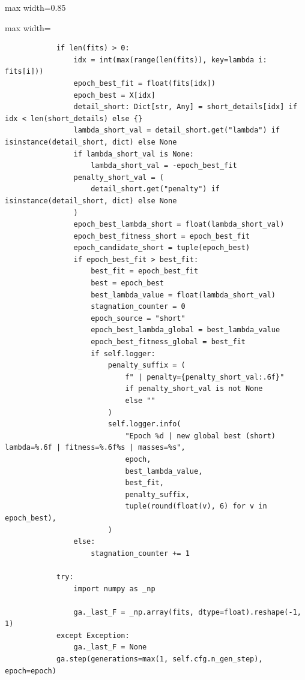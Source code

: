 \begin{listing}[H]
\begin{adjustbox}{max width=0.85\textwidth}
\begin{minipage}{\linewidth}
{\begin{adjustbox}{max width=\textwidth}
\begin{minipage}{\textwidth}
\begin{verbatim}
            if len(fits) > 0:
                idx = int(max(range(len(fits)), key=lambda i: fits[i]))
                epoch_best_fit = float(fits[idx])
                epoch_best = X[idx]
                detail_short: Dict[str, Any] = short_details[idx] if idx < len(short_details) else {}
                lambda_short_val = detail_short.get("lambda") if isinstance(detail_short, dict) else None
                if lambda_short_val is None:
                    lambda_short_val = -epoch_best_fit
                penalty_short_val = (
                    detail_short.get("penalty") if isinstance(detail_short, dict) else None
                )
                epoch_best_lambda_short = float(lambda_short_val)
                epoch_best_fitness_short = epoch_best_fit
                epoch_candidate_short = tuple(epoch_best)
                if epoch_best_fit > best_fit:
                    best_fit = epoch_best_fit
                    best = epoch_best
                    best_lambda_value = float(lambda_short_val)
                    stagnation_counter = 0
                    epoch_source = "short"
                    epoch_best_lambda_global = best_lambda_value
                    epoch_best_fitness_global = best_fit
                    if self.logger:
                        penalty_suffix = (
                            f" | penalty={penalty_short_val:.6f}"
                            if penalty_short_val is not None
                            else ""
                        )
                        self.logger.info(
                            "Epoch %d | new global best (short) lambda=%.6f | fitness=%.6f%s | masses=%s",
                            epoch,
                            best_lambda_value,
                            best_fit,
                            penalty_suffix,
                            tuple(round(float(v), 6) for v in epoch_best),
                        )
                else:
                    stagnation_counter += 1

            try:
                import numpy as _np

                ga._last_F = _np.array(fits, dtype=float).reshape(-1, 1)
            except Exception:
                ga._last_F = None
            ga.step(generations=max(1, self.cfg.n_gen_step), epoch=epoch)


\end{verbatim}
\end{minipage}
\end{adjustbox}}
\end{minipage}
\end{adjustbox}
\end{listing}
